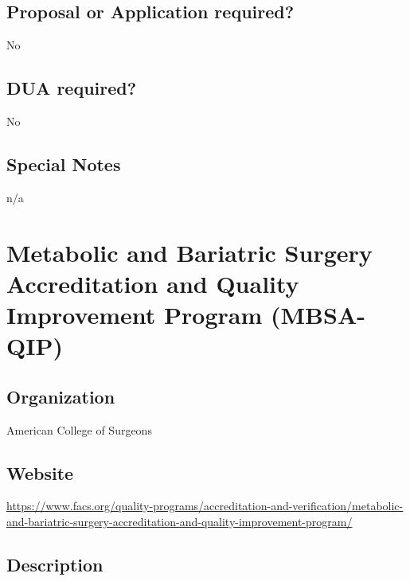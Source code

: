 \documentclass[
]{book}
\begin{document}
\hypertarget{proposal-or-application-required-39}{%
\section{Proposal or Application required?}\label{proposal-or-application-required-39}}

No

\hypertarget{dua-required-39}{%
\section{DUA required?}\label{dua-required-39}}

No

\hypertarget{special-notes-39}{%
\section{Special Notes}\label{special-notes-39}}

n/a

\mainmatter

\hypertarget{metabolic-and-bariatric-surgery-accreditation-and-quality-improvement-program-mbsa-qip}{%
\chapter{Metabolic and Bariatric Surgery Accreditation and Quality Improvement Program (MBSA-QIP)}\label{metabolic-and-bariatric-surgery-accreditation-and-quality-improvement-program-mbsa-qip}}

\hypertarget{organization-40}{%
\section{Organization}\label{organization-40}}

American College of Surgeons

\hypertarget{website-40}{%
\section{Website}\label{website-40}}

\url{https://www.facs.org/quality-programs/accreditation-and-verification/metabolic-and-bariatric-surgery-accreditation-and-quality-improvement-program/}

\hypertarget{description-40}{%
\section{Description}\label{description-40}}
\end{document}
